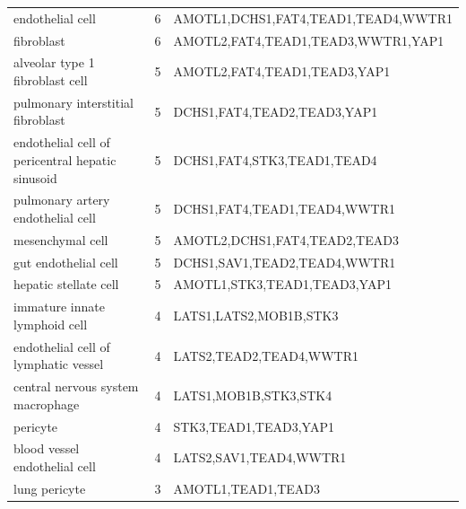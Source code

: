 \begin{longtable}{lcl}
endothelial cell & 6 & AMOTL1,DCHS1,FAT4,TEAD1,TEAD4,WWTR1 \\
fibroblast & 6 & AMOTL2,FAT4,TEAD1,TEAD3,WWTR1,YAP1 \\
alveolar type 1 fibroblast cell & 5 & AMOTL2,FAT4,TEAD1,TEAD3,YAP1 \\
pulmonary interstitial fibroblast & 5 & DCHS1,FAT4,TEAD2,TEAD3,YAP1 \\
endothelial cell of pericentral hepatic sinusoid & 5 & DCHS1,FAT4,STK3,TEAD1,TEAD4 \\
pulmonary artery endothelial cell & 5 & DCHS1,FAT4,TEAD1,TEAD4,WWTR1 \\
mesenchymal cell & 5 & AMOTL2,DCHS1,FAT4,TEAD2,TEAD3 \\
gut endothelial cell & 5 & DCHS1,SAV1,TEAD2,TEAD4,WWTR1 \\
hepatic stellate cell & 5 & AMOTL1,STK3,TEAD1,TEAD3,YAP1 \\
immature innate lymphoid cell & 4 & LATS1,LATS2,MOB1B,STK3 \\
endothelial cell of lymphatic vessel & 4 & LATS2,TEAD2,TEAD4,WWTR1 \\
central nervous system macrophage & 4 & LATS1,MOB1B,STK3,STK4 \\
pericyte & 4 & STK3,TEAD1,TEAD3,YAP1 \\
blood vessel endothelial cell & 4 & LATS2,SAV1,TEAD4,WWTR1 \\
lung pericyte & 3 & AMOTL1,TEAD1,TEAD3 \\
\end{longtable}
